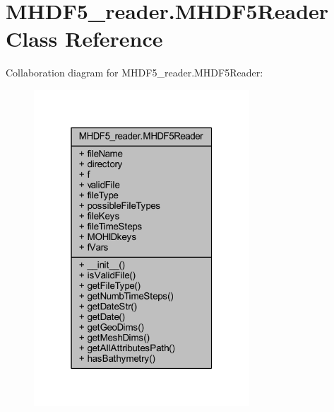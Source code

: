 \hypertarget{class_m_h_d_f5__reader_1_1_m_h_d_f5_reader}{}\section{M\+H\+D\+F5\+\_\+reader.\+M\+H\+D\+F5\+Reader Class Reference}
\label{class_m_h_d_f5__reader_1_1_m_h_d_f5_reader}


Collaboration diagram for M\+H\+D\+F5\+\_\+reader.\+M\+H\+D\+F5\+Reader\+:\nopagebreak
\begin{figure}[H]
\begin{center}
\leavevmode
\includegraphics[width=229pt]{class_m_h_d_f5__reader_1_1_m_h_d_f5_reader__coll__graph}
\end{center}
\end{figure}
